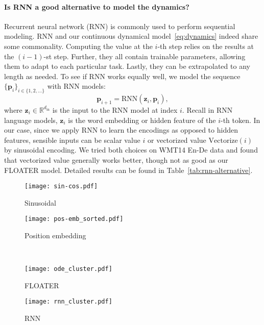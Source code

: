 \documentclass[11pt]{article}
\def\vp{{\bm{p}}}
\def\vz{{\bm{z}}}
\def\sR{{\mathbb{R}}}
\begin{document}
\paragraph{Is RNN a good alternative to model the dynamics?} 
Recurrent neural network (RNN) is commonly used to perform sequential modeling. RNN and our continuous dynamical model~\eqref{eq:dynamics} indeed share some commonality. Computing the value at the $i$-th step relies on the results at the $(i-1)$-st step. Further, they all contain trainable parameters, allowing them to adapt to each particular task. Lastly, they can be extrapolated to any length as needed. To see if RNN works equally well, we model the sequence $\{\vp_i\}_{i\in\{1,2,\dots\}}$  with RNN models:
\begin{equation}
    \label{eq:dynamic-RNN}
    \vp_{i+1}=\mathrm{RNN}(\vz_i, \vp_{i}),
\end{equation}
where $\vz_i\in\sR^{d_{\mathrm{in}}}$ is the input to the RNN model at index $i$. Recall in RNN language models, $\vz_i$ is the word embedding or hidden feature of the $i$-th token. In our case, since we apply RNN to learn the encodings as opposed to hidden features, sensible inputs can be scalar value $i$ or vectorized value $\mathrm{Vectorize}(i)$ by sinusoidal encoding. We tried both choices on WMT14 En-De data and found that vectorized value generally works better, though not as good as our FLOATER model. Detailed results can be found in Table~\ref{tab:rnn-alternative}.
\begin{figure*}
    \centering
    \begin{subfigure}{0.45\textwidth}
    \caption{Sinusoidal}\label{fig:sin-cos}
    \texttt{[image: sin-cos.pdf]}
    \end{subfigure}
    \begin{subfigure}{0.45\textwidth}
    \caption{Position embedding}\label{fig:pos-emb}
    \texttt{[image: pos-emb\_sorted.pdf]}
    \end{subfigure}\\
    \begin{subfigure}{0.45\textwidth}
    \texttt{[image: ode\_cluster.pdf]}\caption{FLOATER}\label{fig:flower}
    \end{subfigure}
    \begin{subfigure}{0.45\textwidth}
    \texttt{[image: rnn\_cluster.pdf]}\caption{RNN}\label{fig:rnn}
    \end{subfigure}
    \caption{Visualizing the four different position methods. All models are trained using the Transformer-base architecture and En-De dataset. For better visualization, dimension indices are permuted in Figure~\ref{fig:pos-emb}-\ref{fig:rnn}.}
    \label{fig:visualize-encoding}
\end{figure*}
\end{document}
